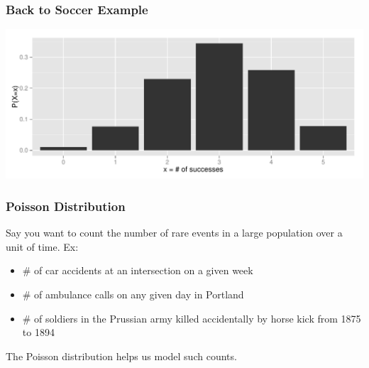 \documentclass[handout]{beamer}
\newcommand{\blue}[1]{\textcolor{blue2}{#1}}
\begin{document}
\begin{frame}
\frametitle{Back to Soccer Example}

\begin{center}
\includegraphics[width=\textwidth]{figure/bin.pdf}
\end{center}

\end{frame}


\begin{frame}
\frametitle{Poisson Distribution}

Say you want to count the number of rare events in a large population over a unit of time.  Ex:
\begin{itemize}
\pause \item \# of car accidents at an intersection on a given week
\pause \item \# of ambulance calls on any given day in Portland
\pause \item \# of soldiers in the Prussian army killed accidentally by horse kick from 1875 to 1894
\end{itemize}

\vskip 0.25cm

\pause The \blue{Poisson distribution} helps us model such counts.

\end{frame}
\end{document}
